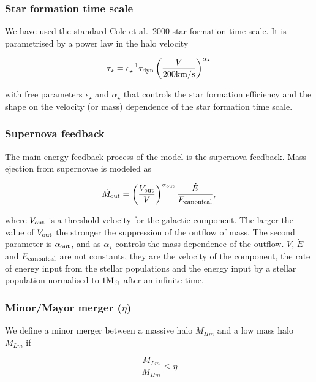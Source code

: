 \documentclass[useAMS,usenatbib]{mn2e}
\newcommand{\etal}{et al.~}
\begin{document}
\subsubsection{Star formation time scale}

We have used the standard Cole \etal 2000 star formation time
scale. It is parametrised by a power law in the halo velocity

\begin{equation}
 \tau_{\star} = \epsilon^{-1}_{\star}\tau_{{\rm dyn}}\left(
 \frac{V}{200{\rm km/s}}\right)^{\alpha_\star}
\end{equation}

with free parameters $\epsilon_{\star}$ and $\alpha_\star$ that
controls the star formation efficiency and the shape on the velocity
(or mass) dependence of the star formation time scale.


\subsubsection{Supernova feedback}

The main energy feedback process of the model is the supernova
feedback. Mass ejection from supernovae is modeled as

\begin{equation}
 \dot{M}_{\rm out}=\left( \frac{V_{\rm out}}{V}
 \right)^{\alpha_{\rm out}}\frac{\dot{E}}{E_{\rm canonical}}, \label{eq:supernovae}
\end{equation}

where $V_{\rm out}$ is a threshold velocity for the galactic
component. The larger the value of $V_{\rm out}$ the stronger the
suppression of the outflow of mass. The second parameter is
$\alpha_{\rm out}$, and as $\alpha_\star$ controls the mass dependence
of the outflow. $V$, $\dot{E}$ and $E_{\rm canonical}$ are not
constants, they are the velocity of the component, the rate of energy
input from the stellar populations and the energy input by a stellar
population normalised to $1 {\rm M}_{\odot}$ after an infinite time.


\subsubsection{Minor/Mayor merger ($\eta$)}

We define a minor merger between a massive halo $M_{Hm}$ and a low
mass halo $M_{Lm}$ if

\begin{equation}
\frac{M_{Lm}}{M_{Hm}} \leq \eta
\end{equation}
\end{document}
